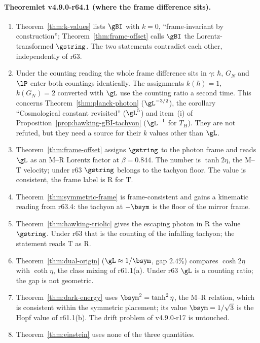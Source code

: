 \paragraph{Theoremlet v4.9.0-r64.1 (where the frame difference sits).}
\begin{enumerate}[leftmargin=2em]
\item[(a)] Theorem~\ref{thm:k-values} lists \(\gBI\) with \(k=0\), ``frame-invariant by construction''; Theorem~\ref{thm:frame-offset} calls \(\gBI\) the Lorentz-transformed
\(\gstring\).  The two statements contradict each other, independently of r63.
\item[(b)] Under the counting reading the whole frame difference sits in \(\gamma\): \(\hbar\), \(G_N\) and \(\lP\) enter both countings identically.  The assignments
\(k(\hbar)=1\), \(k(G_N)=2\) converted with \(\gL\) use the counting ratio a second time.  This concerns Theorem~\ref{thm:planck-photon} (\(\gL^{-3/2}\)), the corollary
``Cosmological constant revisited'' (\(\gL^{5}\)) and item~(i) of Proposition~\ref{prop:hawking-gBI-tachyon} (\(\gL^{-1}\) for \(T_H\)).  They are not refuted, but they need a
source for their \(k\) values other than \(\gL\).
\item[(c)] Theorem~\ref{thm:frame-offset} assigns \(\gstring\) to the photon frame and reads \(\gL\) as an M--R Lorentz factor at \(\beta=0.844\).  The number is \(\tanh2\eta\), the
M--T velocity; under r63 \(\gstring\) belongs to the tachyon floor.  The value is consistent, the frame label is R for T.
\item[(d)] Theorem~\ref{thm:symmetric-frame} is frame-consistent and gains a kinematic reading from r63.4: the tachyon at \(-\bsym\) is the floor of the mirror frame.
\item[(e)] Theorem~\ref{thm:hawking-triolic} gives the escaping photon in R the value \(\gstring\).  Under r63 that is the counting of the infalling tachyon; the statement
reads T as R.
\item[(f)] Theorem~\ref{thm:dual-origin} (\(\gL\approx1/\bsym\), gap \(2.4\%\)) compares \(\cosh2\eta\) with \(\coth\eta\), the class mixing of r61.1(a).  Under r63 \(\gL\) is a
counting ratio; the gap is not geometric.
\item[(g)] Theorem~\ref{thm:dark-energy} uses \(\bsym^2=\tanh^2\eta\), the M--R relation, which is consistent within the symmetric placement; its value \(\bsym=1/\sqrt3\) is the
Hopf value of r61.1(b).  The drift problem of v4.9.0-r17 is untouched.
\item[(h)] Theorem~\ref{thm:einstein} uses none of the three quantities.
\end{enumerate}

